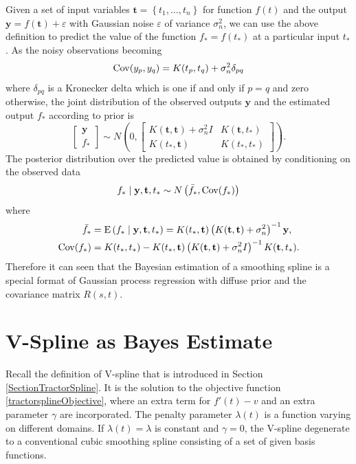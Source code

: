 Given a set of input variables $\mathbf{t} = \left\lbrace t_1,\ldots,t_n\right\rbrace$ for function $f(t)$ and the output $\mathbf{y}=f(\mathbf{t})+\varepsilon$ with \iid  Gaussian noise $\varepsilon$ of variance $\sigma_n^2$,  we can use the above definition to predict the value of the function $f_*=f(t_*)$ at a particular input $t_*$. As the noisy observations becoming
\begin{equation*} %
\Cov (y_p,y_q) = K(t_p,t_q)+\sigma_n^2 \delta_{pq}
\end{equation*}
where $\delta_{pq}$ is a Kronecker delta which is one if and only if $p=q$ and zero otherwise, the joint distribution of the observed outputs $\mathbf{y}$ and the estimated output $f_*$ according to prior is
\begin{equation}
\begin{bmatrix}
\mathbf{y}\\
f_*
\end{bmatrix} \sim N \left(  
0,  \begin{bmatrix}
K(\mathbf{t},\mathbf{t}) +\sigma_n^2I& K(\mathbf{t},t_*) \\
K(t_*,\mathbf{t}) & K(t_*,t_*)
\end{bmatrix} 
\right).
\end{equation}
The posterior distribution over the predicted value is obtained by conditioning on the observed data
\begin{equation*}
f_* \mid  \mathbf{y},\mathbf{t},t_* \sim N\left(\bar{f_*},\mathrm{Cov} (f_*)\right)
\end{equation*}
where 
\begin{align}
\bar{f_*}&=\mathrm{E} \left( f_* \mid  \mathbf{y},\mathbf{t},t_*\right) = K(t_*,\mathbf{t})\left( K(\mathbf{t},\mathbf{t})+\sigma_n^2\right) ^{-1}\mathbf{y},\\
\mathrm{Cov}(f_*)&=K(t_*,t_*)-K(t_*,\mathbf{t})\left( K(\mathbf{t},\mathbf{t})+\sigma_n^2I\right) ^{-1}K(\mathbf{t},t_*).
\end{align}
Therefore it can seen that the Bayesian estimation of a smoothing spline is a special format of Gaussian process regression with diffuse prior and the covariance matrix $R(s,t)$. 





\section{V-Spline as Bayes Estimate}


Recall the definition of V-spline that is introduced in Section \ref{SectionTractorSpline}. It is the solution to the objective function \eqref{tractorsplineObjective}, where an extra term for $f'(t)-v$ and an extra parameter $\gamma$ are incorporated. The penalty parameter $\lambda(t)$ is a function varying on different domains. If $\lambda(t)=\lambda$ is constant and $\gamma=0$, the V-spline degenerate to a conventional cubic smoothing spline consisting of a set of given basis functions.  

